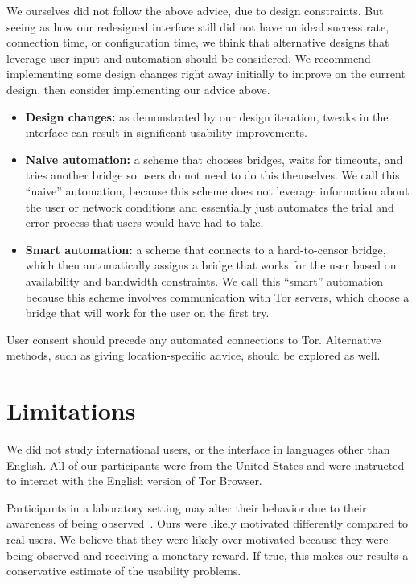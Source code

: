 \documentclass[USenglish,oneside,twocolumn]{article}
\begin{document}
We ourselves did not follow the above advice, due to design constraints. But seeing as how our redesigned interface still did not have an ideal success rate, connection time, or configuration time, we think that alternative designs that leverage user input and automation should be considered. We recommend implementing some design changes right away initially to improve on the current design, then consider implementing our advice above. \\

\begin{itemize}
\item{\bfseries Design changes:} as demonstrated by our design iteration, tweaks in the interface can result in significant usability improvements.
\item{\bfseries Naive automation:} a scheme that chooses bridges, waits for timeouts, and tries another bridge so users do not need to do this themselves. We call this ``naive'' automation, because this scheme does not leverage information about the user or network conditions and essentially just automates the trial and error process that users would have had to take. 
\item{\bfseries Smart automation:} a scheme that connects to a hard-to-censor bridge, which then automatically assigns a bridge that works for the user based on availability and bandwidth constraints. We call this ``smart'' automation because this scheme involves communication with Tor servers, which choose a bridge that will work for the user on the first try. 
\end{itemize}

User consent should precede any automated connections to Tor. Alternative methods, such as giving location-specific advice, should be explored as well.

\section{Limitations}
\label{sec:limitations}
We did not study international users, or the interface in languages other than English. All of our participants were from the United States and were instructed to interact with the English version of Tor Browser.

Participants in a laboratory setting may alter their behavior due to their awareness of being observed~\cite{mccarney2007hawthorne}. Ours were likely motivated differently compared to real users. We believe that they were likely over-motivated because they were being observed and receiving a monetary reward. If true, this makes our results a conservative estimate of the usability problems. 
\end{document}
